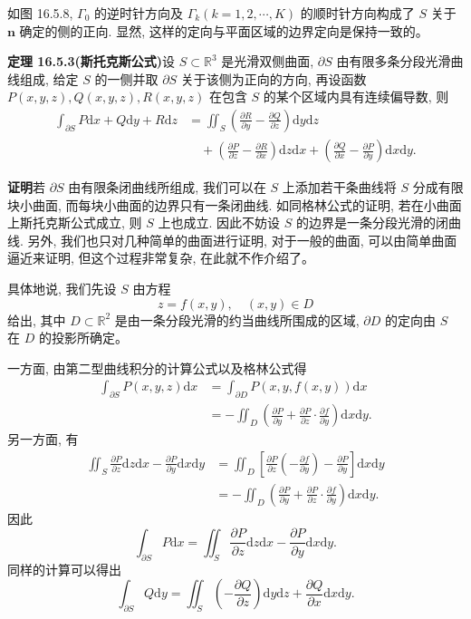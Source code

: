 \documentclass[UTF8,12pt,a4paper,fontset=fandol]{ctexart}
\begin{document}
如图 16.5.8, $\Gamma_0$ 的逆时针方向及 $\Gamma_k(k=1,2,\cdots,K)$ 的顺时针方向构成了 $S$ 关于 $\boldsymbol n$ 确定的侧的正向. 显然, 这样的定向与平面区域的边界定向是保持一致的。

\noindent\textbf{定理 16.5.3(斯托克斯公式)}\quad 设 $S\subset\mathbb R^3$ 是光滑双侧曲面, $\partial S$ 由有限多条分段光滑曲线组成, 给定 $S$ 的一侧并取 $\partial S$ 关于该侧为正向的方向, 再设函数 $P(x,y,z),Q(x,y,z),R(x,y,z)$ 在包含 $S$ 的某个区域内具有连续偏导数, 则
\[
\begin{aligned}
  \int_{\partial S}P\mathrm dx+Q\mathrm dy+R\mathrm dz
  &=\iint_S\left(\frac{\partial R}{\partial y}-\frac{\partial Q}{\partial z}\right)\mathrm dy\mathrm dz\\
  &\quad+\left(\frac{\partial P}{\partial z}-\frac{\partial R}{\partial x}\right)\mathrm dz\mathrm dx
    +\left(\frac{\partial Q}{\partial x}-\frac{\partial P}{\partial y}\right)\mathrm dx\mathrm dy.
\end{aligned}
\]

\noindent\textbf{证明}\quad 若 $\partial S$ 由有限条闭曲线所组成, 我们可以在 $S$ 上添加若干条曲线将 $S$ 分成有限块小曲面, 而每块小曲面的边界只有一条闭曲线. 如同格林公式的证明, 若在小曲面上斯托克斯公式成立, 则 $S$ 上也成立. 因此不妨设 $S$ 的边界是一条分段光滑的闭曲线. 另外, 我们也只对几种简单的曲面进行证明, 对于一般的曲面, 可以由简单曲面逼近来证明, 但这个过程非常复杂, 在此就不作介绍了。

具体地说, 我们先设 $S$ 由方程
\begin{equation}
  z=f(x,y),\quad (x,y)\in D
  \tag{16.5.1}
\end{equation}
给出, 其中 $D\subset\mathbb R^2$ 是由一条分段光滑的约当曲线所围成的区域, $\partial D$ 的定向由 $S$ 在 $D$ 的投影所确定。

一方面, 由第二型曲线积分的计算公式以及格林公式得
\[
\begin{aligned}
  \int_{\partial S}P(x,y,z)\mathrm dx
  &=\int_{\partial D}P(x,y,f(x,y))\mathrm dx\\
  &=-\iint_D\left(\frac{\partial P}{\partial y}
    +\frac{\partial P}{\partial z}\cdot\frac{\partial f}{\partial y}\right)\mathrm dx\mathrm dy.
\end{aligned}
\]
另一方面, 有
\[
\begin{aligned}
  \iint_S\frac{\partial P}{\partial z}\mathrm dz\mathrm dx
  -\frac{\partial P}{\partial y}\mathrm dx\mathrm dy
  &=\iint_D\left[\frac{\partial P}{\partial z}\left(-\frac{\partial f}{\partial y}\right)
    -\frac{\partial P}{\partial y}\right]\mathrm dx\mathrm dy\\
  &=-\iint_D\left(\frac{\partial P}{\partial y}
    +\frac{\partial P}{\partial z}\cdot\frac{\partial f}{\partial y}\right)\mathrm dx\mathrm dy.
\end{aligned}
\]
因此
\[
  \int_{\partial S}P\mathrm dx
  =\iint_S\frac{\partial P}{\partial z}\mathrm dz\mathrm dx
    -\frac{\partial P}{\partial y}\mathrm dx\mathrm dy.
\]
同样的计算可以得出
\[
  \int_{\partial S}Q\mathrm dy
  =\iint_S\left(-\frac{\partial Q}{\partial z}\right)\mathrm dy\mathrm dz
    +\frac{\partial Q}{\partial x}\mathrm dx\mathrm dy.
\]
\end{document}
